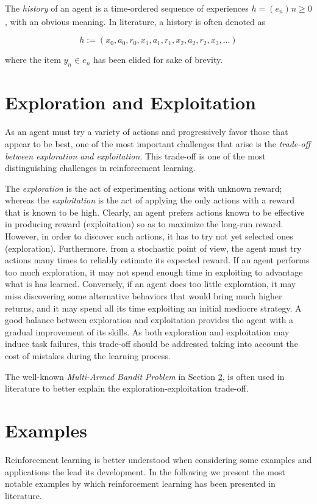 The \textit{history} of an agent is a time-ordered sequence of experiences $h=(e_{n})_{}n\geq0$, with an obvious meaning.
%
In literature, a history is often denoted as

$$
h:=(x_{0},a_{0},r_{0},x_{1},a_{1},r_{1},x_{2},a_{2},r_{2},x_{3}, ...)
$$

where the item $y_{n}\in e_{n}$ has been elided for sake of brevity.


\section{Exploration and Exploitation}
\label{sec:reinforcement-learning-exploration-exploitation}
As an agent must try a variety of actions and progressively favor those that appear to be best, one of the most important challenges that arise is the \textit{trade-off between exploration and exploitation}.
%
This trade-off is one of the most distinguishing challenges in reinforcement learning.

The \textit{exploration} is the act of experimenting actions with unknown reward; whereas the \textit{exploitation} is the act of applying the only actions with a reward that is known to be high.
Clearly, an agent prefers actions known to be effective in producing reward (exploitation) so as to maximize the long-run reward.
However, in order to discover such actions, it has to try not yet selected ones (exploration).
Furthermore, from a stochastic point of view, the agent must try actions many times to reliably estimate its expected reward.
If an agent performs too much exploration, it may not spend enough time in exploiting to advantage what is has learned.
Conversely, if an agent does too little exploration, it may miss discovering some alternative behaviors that would bring much higher returns, and it may spend all its time exploiting an initial mediocre strategy.
A good balance between exploration and exploitation provides the agent with a gradual improvement of its skills.
As both exploration and exploitation may induce task failures, this trade-off should be addressed taking into account the cost of mistakes during the learning process.

The well-known \textit{Multi-Armed Bandit Problem} in Section \ref{sec:reinforcement-learning-examples}, is often used in literature to better explain the exploration-exploitation trade-off.

\section{Examples}
\label{sec:reinforcement-learning-examples}
Reinforcement learning is better understood when considering some examples and applications the lead its development.
In the following we present the most notable examples by which reinforcement learning has been presented in literature.

